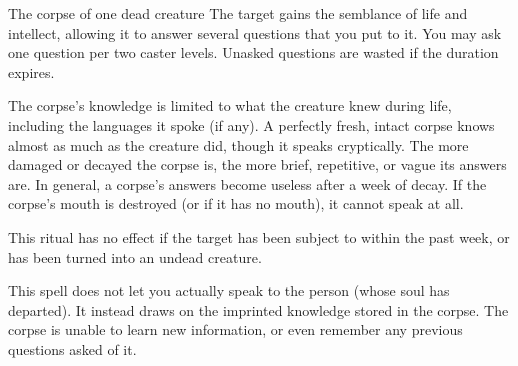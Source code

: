 
\spellrng{\rngclose}
\begin{spelltarget}{The corpse of one dead creature}
    \spelleffect The target gains the semblance of life and intellect, allowing it to answer several questions that you put to it. You may ask one question per two caster levels. Unasked questions are wasted if the duration expires.

    The corpse's knowledge is limited to what the creature knew during life, including the languages it spoke (if any). A perfectly fresh, intact corpse knows almost as much as the creature did, though it speaks cryptically. The more damaged or decayed the corpse is, the more brief, repetitive, or vague its answers are. In general, a corpse's answers become useless after a week of decay. If the corpse's mouth is destroyed (or if it has no mouth), it cannot speak at all.
\end{spelltarget}

\spellnotes This ritual has no effect if the target has been subject to  within the past week, or has been turned into an undead creature.

\par This spell does not let you actually speak to the person (whose soul has departed). It instead draws on the imprinted knowledge stored in the corpse. The corpse is unable to learn new information, or even remember any previous questions asked of it.

